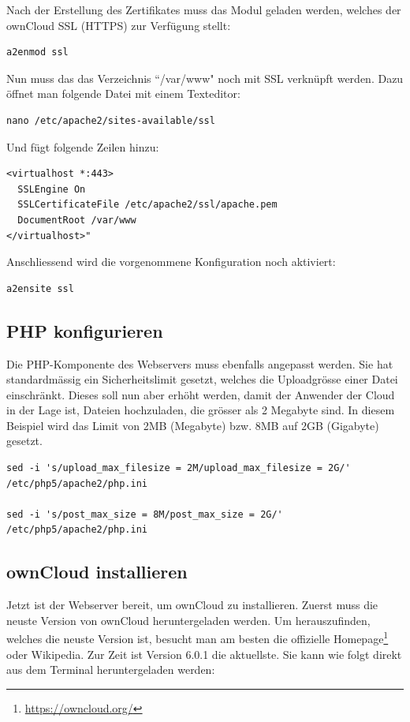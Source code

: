 Nach der Erstellung des Zertifikates muss das Modul geladen werden, welches der ownCloud SSL (HTTPS) zur Verfügung stellt:

\begin{lstlisting}
a2enmod ssl
\end{lstlisting}

Nun muss das das Verzeichnis ``/var/www" noch mit SSL verknüpft werden. Dazu öffnet man folgende Datei mit einem Texteditor: 

\begin{lstlisting}
nano /etc/apache2/sites-available/ssl
\end{lstlisting}

Und fügt folgende Zeilen hinzu: 

\begin{lstlisting}
<virtualhost *:443>
  SSLEngine On
  SSLCertificateFile /etc/apache2/ssl/apache.pem
  DocumentRoot /var/www  
</virtualhost>" 
\end{lstlisting}

Anschliessend wird die vorgenommene Konfiguration noch aktiviert:

\begin{lstlisting}
a2ensite ssl
\end{lstlisting}

\subsection{PHP konfigurieren}
Die PHP-Komponente des Webservers muss ebenfalls angepasst werden. Sie hat standardmässig ein Sicherheitslimit gesetzt, welches die Uploadgrösse einer Datei einschränkt. Dieses soll nun aber erhöht werden, damit der Anwender der Cloud in der Lage ist, Dateien hochzuladen, die grösser als 2 Megabyte sind. In diesem Beispiel wird das Limit von 2MB (Megabyte) bzw. 8MB auf 2GB (Gigabyte) gesetzt.
\\

\begin{lstlisting}
sed -i 's/upload_max_filesize = 2M/upload_max_filesize = 2G/' /etc/php5/apache2/php.ini

sed -i 's/post_max_size = 8M/post_max_size = 2G/' /etc/php5/apache2/php.ini
\end{lstlisting}

\subsection{ownCloud installieren}
Jetzt ist der Webserver bereit, um ownCloud zu installieren. Zuerst muss die neuste Version von ownCloud heruntergeladen werden. Um herauszufinden, welches die neuste Version ist, besucht man am besten die offizielle Homepage\footnote{\url{https://owncloud.org/}} oder Wikipedia. Zur Zeit ist Version 6.0.1 die aktuellste. Sie kann wie folgt direkt aus dem Terminal heruntergeladen werden:

